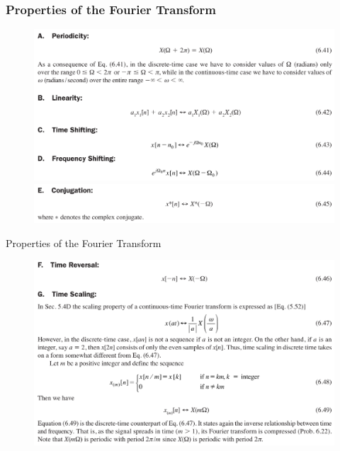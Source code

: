 \documentclass[pdflatex,compress,mathserif]{beamer}
\begin{document}
\begin{frame}
	\frametitle{Properties of the Fourier Transform}
	\begin{figure}
		\centering
		\includegraphics[width=\linewidth]{img/img12}
		\includegraphics[width=\linewidth]{img/img13}
	\end{figure}
\end{frame}

\begin{frame}{Properties of the Fourier Transform}
	\begin{figure}
		\centering
		\includegraphics[width=\linewidth]{img/img14}
	\end{figure}
\end{frame}
\end{document}
